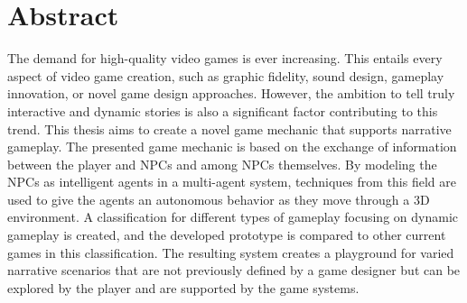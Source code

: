 \chapter{Abstract}\label{Abstract}
The demand for high-quality video games is ever increasing. This entails every aspect of video game creation, such as graphic fidelity, sound design, gameplay innovation, or novel game design approaches. However, the ambition to tell truly interactive and dynamic stories is also a significant factor contributing to this trend. This thesis aims to create a novel game mechanic that supports narrative gameplay. The presented game mechanic is based on the exchange of information between the player and NPCs and among NPCs themselves. By modeling the NPCs as intelligent agents in a multi-agent system, techniques from this field are used to give the agents an autonomous behavior as they move through a 3D environment. A classification for different types of gameplay focusing on dynamic gameplay is created, and the developed prototype is compared to other current games in this classification. The resulting system creates a playground for varied narrative scenarios that are not previously defined by a game designer but can be explored by the player and are supported by the game systems.